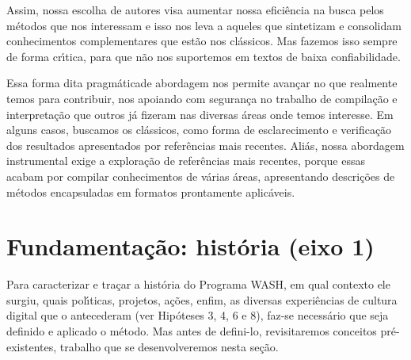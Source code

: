 \documentclass[
12pt,		%
openright,	%
twoside,  %
a4paper,			%
chapter=TITLE,		%
english,			%
french,				%
spanish,			%
brazil				%
]{USPSC-classe/USPSC}
\begin{document}
Assim, nossa escolha de autores visa aumentar nossa efici\^encia na busca pelos m\'etodos que nos interessam e isso nos leva a aqueles que sintetizam e consolidam conhecimentos complementares que est\~ao nos cl\'assicos. Mas fazemos isso sempre de forma cr\'{\i}tica, para que n\~ao nos suportemos em textos de baixa confiabilidade.

















Essa forma dita \textquotedbl pragm\'atica\textquotedbl  de abordagem nos permite avan\c{c}ar no que realmente temos para contribuir, nos apoiando com seguran\c{c}a no trabalho de compila\c{c}\~ao e interpreta\c{c}\~ao que outros j\'a fizeram nas diversas \'areas onde temos interesse. Em alguns casos, buscamos os cl\'assicos, como forma de esclarecimento e verifica\c{c}\~ao dos resultados apresentados por refer\^encias mais recentes. Ali\'as, nossa abordagem instrumental exige a explora\c{c}\~ao de refer\^encias mais recentes, porque essas acabam por compilar conhecimentos de v\'arias \'areas, apresentando descri\c{c}\~oes de m\'etodos encapsuladas em formatos prontamente aplic\'aveis.

















\section[Fundamenta\c{c}\~ao: hist\'oria (eixo 1)]{Fundamenta\c{c}\~ao: hist\'oria (eixo 1)}\label{Fundamenta\c{c}\~ao: hist\'oria (eixo 1)}
Para caracterizar e tra\c{c}ar a hist\'oria do Programa WASH, em qual contexto ele surgiu, quais pol\'{\i}ticas, projetos, a\c{c}\~oes, enfim, as diversas experi\^encias de cultura digital que o antecederam (ver Hip\'oteses 3, 4, 6 e 8), faz-se  necess\'ario que seja definido e aplicado o m\'etodo. Mas antes de defini-lo, revisitaremos conceitos pr\'e-existentes, trabalho que se desenvolveremos nesta se\c{c}\~ao.
\end{document}
